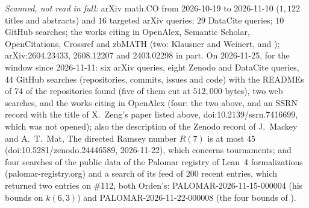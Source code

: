 \documentclass[11pt]{amsart}
\theoremstyle{plain}
\theoremstyle{definition}
\theoremstyle{remark}
\begin{document}
\medskip
\noindent\emph{Scanned, not read in full:} arXiv math.CO from 2026-10-19 to 2026-11-10 ($1{,}122$
titles and abstracts) and $16$ targeted arXiv queries; $29$ DataCite queries; $10$ GitHub
searches; the works citing \cite{IRW21} in OpenAlex, Semantic Scholar, OpenCitations, Crossref and
zbMATH (two: Klausner and Weinert, and \cite{Orden}); arXiv:2604.23433, 2608.12207 and 2403.02298
in part. On 2026-11-25, for the window since 2026-11-11: six arXiv queries, eight Zenodo and
DataCite queries, $44$ GitHub searches (repositories, commits, issues and code) with the READMEs of
$74$ of the repositories found (five of them cut at $512{,}000$ bytes), two web searches, and the
works citing \cite{IRW21} in OpenAlex (four: the two above, \cite{Orden2} and an SSRN record with
the title of X.~Zeng's paper listed above, doi:10.2139/ssrn.7416699, which was not opened); also the
description of the Zenodo record of J.~Mackey and A.~T.~Mat, The directed Ramsey number $R(7)$ is at
most $45$ (doi:10.5281/zenodo.24446589, 2026-11-22), which concerns tournaments; and four searches
of the public data of the Palomar registry of Lean~4 formalizations (palomar-registry.org) and a
search of its feed of $200$ recent entries, which returned two entries on \#112, both Orden's:
PALOMAR-2026-11-15-000004 (his bounds on $k(6,3)$) and PALOMAR-2026-11-22-000008 (the four bounds
of \cite{Orden2}).
\end{document}
